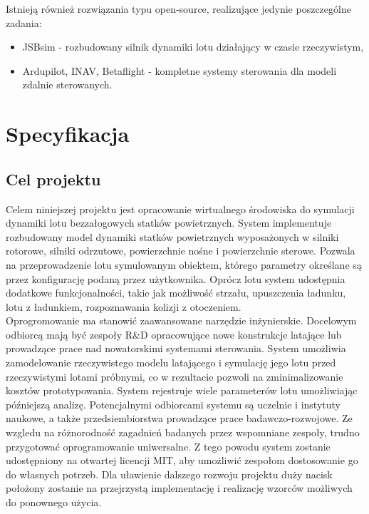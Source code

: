 \documentclass[15pt]{sprawozdanie}
\begin{document}
Istnieją również rozwiązania typu open-source, realizujące jedynie poszczególne zadania:

\begin{itemize}
\item JSBsim - rozbudowany silnik dynamiki lotu działający w czasie rzeczywistym,
\item Ardupilot, INAV, Betaflight - kompletne systemy sterowania dla modeli zdalnie sterowanych.
\end{itemize}


\section{Specyfikacja}


\subsection{Cel projektu}

Celem niniejszej projektu jest opracowanie wirtualnego środowiska do symulacji dynamiki lotu bezzałogowych statków powietrznych. System implementuje rozbudowany model dynamiki statków powietrznych wyposażonych w silniki rotorowe, silniki odrzutowe, powierzchnie nośne i powierzchnie sterowe. Pozwala na przeprowadzenie lotu symulowanym obiektem, którego parametry określane są przez konfigurację podaną przez użytkownika. Oprócz lotu system udostępnia dodatkowe funkcjonalności, takie jak możliwość strzału, upuszczenia ładunku, lotu z ładunkiem, rozpoznawania kolizji z otoczeniem.\\

Oprogromowanie ma stanowić zaawansowane narzędzie inżynierskie. Docelowym odbiorcą mają być zespoły R\&D opracowujące nowe konstrukcje latające lub prowadzące prace nad nowatorskimi systemami sterowania. System umożliwia zamodelowanie rzeczywistego modelu latającego i symulację jego lotu przed rzeczywistymi lotami próbnymi, co w rezultacie pozwoli na zminimalizowanie kosztów prototypowania. System rejestruje wiele parameterów lotu umożliwiając późniejszą analizę. Potencjalnymi odbiorcami systemu są uczelnie i instytuty naukowe, a także przedsiembiorstwa prowadzące prace badawczo-rozwojowe. Ze wzgledu na różnorodność zagadnień badanych przez wspomniane zespoły, trudno przygotować oprogramowanie uniwersalne. Z tego powodu system zostanie udostępniony na otwartej licencji MIT, aby umożliwić zespołom dostosowanie go do własnych potrzeb. Dla uławienie dalszego rozwoju projektu duży nacisk położony zostanie na przejrzystą implementację i realizację wzorców możliwych do ponownego użycia.\\
\end{document}
